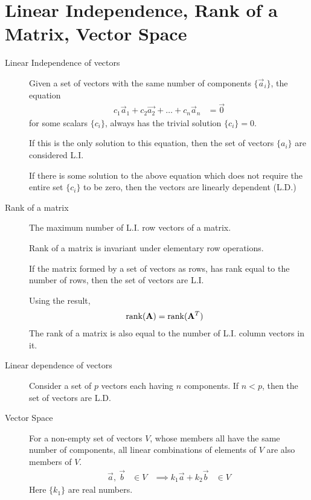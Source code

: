 \section{Linear Independence, Rank of a Matrix, Vector Space}
\begin{description}
    \item[Linear Independence of vectors] Given a set of vectors with the same number of
        components $ \{\vec{a}_i\} $, the equation
        \begin{align}
            c_1 \vec{a}_1 + c_2\vec{a_2} + \dots + c_n\vec{a}_n & = \vec{0}
        \end{align}
        for some scalars $\{c_i\} $, always has the trivial solution
        $ \{c_i\} = 0 $. \par
        If this is the only solution to this equation, then the set of vectors $ \{a_i\} $
        are considered L.I. \par
        If there is some solution to the above equation which does not require the entire
        set $ \{c_i\} $ to be zero, then the vectors are linearly dependent (L.D.)

    \item[Rank of a matrix] The maximum  number of L.I. row vectors of a matrix. \par
        Rank of a matrix is invariant under elementary row operations. \par
        If the matrix formed by a set of vectors as rows, has rank equal to the number
        of rows, then the set of vectors are L.I. \par
        Using the result,
        \begin{align}
            \operatorname{rank}(\mathbf{A}) & = \operatorname{rank}(\mathbf{A}^T)
        \end{align}
        The rank of a matrix is also equal to the number of L.I. column vectors in it.

    \item[Linear dependence of vectors] Consider a set of $ p $ vectors each having
        $ n $ components. If $ n < p $, then the set of vectors are L.D.

    \item[Vector Space] For a non-empty set of vectors $ V $, whose members all have the
        same number of components, all linear combinations of elements of $ V $ are also
        members of $ V $.
        \begin{align}
            \vec{a},\ \vec{b}                 & \in V &
            \implies k_1 \vec{a} + k_2\vec{b} & \in V
        \end{align}
        Here $ \{k_1\} $ are real numbers.


\end{description}
